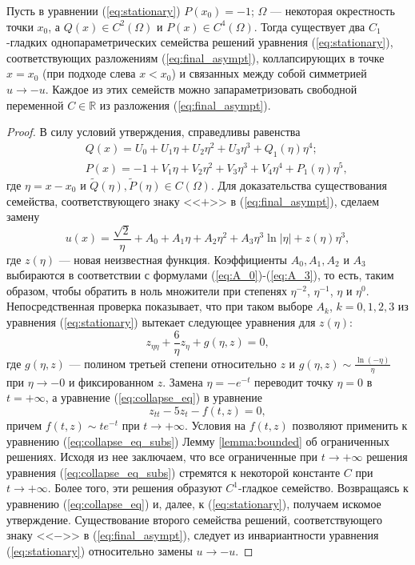 \begin{proposition}
Пусть в уравнении (\ref{eq:stationary}) $P(x_0) = -1$; $\Omega$ --- некоторая окрестность точки $x_0$, а $Q(x) \in C^2(\Omega)$ и $P(x) \in C^4(\Omega)$.
Тогда существует два $C_1$-гладких однопараметрических семейства решений уравнения (\ref{eq:stationary}), соответствующих разложениям (\ref{eq:final_asympt}), коллапсирующих в точке $x = x_0$ (при подходе слева $x < x_0$) и связанных между собой симметрией $u \to -u$.
Каждое из этих семейств можно запараметризовать свободной переменной $C \in \mathbb{R}$ из разложения (\ref{eq:final_asympt}).
\end{proposition}
%
\begin{proof}
В силу условий утверждения, справедливы равенства
%
\begin{eqnarray}
&& Q(x) = U_0 + U_1 \eta + U_2 \eta^2 + U_3 \eta^3 + Q_1(\eta)\eta^4; \\
&& P(x) = -1 + V_1 \eta+ V_2 \eta^2 + V_3 \eta^3 + V_4 \eta^4 + P_1(\eta)\eta^5,
\end{eqnarray}
%
где $\eta = x - x_0$ и $\widetilde{Q}(\eta), \widetilde{P}(\eta) \in C(\Omega)$.
Для доказательства существования семейства, соответствующего знаку <<$+$>> в (\ref{eq:final_asympt}), сделаем замену
%
\begin{equation}
u(x) = \frac{\sqrt{2}}\eta + A_0 + A_1 \eta + A_2 \eta^2 + A_3 \eta^3 \ln|\eta| + z(\eta)\eta^3,
\end{equation}
%
где $z(\eta)$ --- новая неизвестная функция.
Коэффициенты $A_0, A_1, A_2$ и $A_3$ выбираются в соответствии с формулами (\ref{eq:A_0})-(\ref{eq:A_3}), то есть, таким образом, чтобы обратить в ноль множители при степенях $\eta^{-2}$, $\eta^{-1}$, $\eta$ и $\eta^0$.
Непосредственная проверка показывает, что при таком выборе $A_k$, $k = 0,1,2,3$ из уравнения (\ref{eq:stationary}) вытекает следующее уравнения для $z(\eta)$:
%
\begin{equation}
z_{\eta\eta} + \frac{6}{\eta} z_\eta + g(\eta, z) = 0,
\label{eq:collapse_eq}
\end{equation}
%
где $g(\eta, z)$ --- полином третьей степени относительно $z$ и $g(\eta, z) \sim \frac{\ln(-\eta)}{\eta}$ при $\eta \to -0$ и фиксированном $z$.
Замена $\eta = -e^{-t}$ переводит точку $\eta = 0$ в $t = +\infty$, а уравнение (\ref{eq:collapse_eq}) в уравнение
%
\begin{equation}
z_{tt} - 5z_t - f(t,z) = 0,
\label{eq:collapse_eq_subs}
\end{equation}
%
причем $f(t,z) \sim te^{-t}$ при $t \to +\infty$.
Условия на $f(t,z)$ позволяют применить к уравнению (\ref{eq:collapse_eq_subs}) Лемму \ref{lemma:bounded} об ограниченных решениях.
Исходя из нее заключаем, что все ограниченные при $t \to +\infty$ решения уравнения (\ref{eq:collapse_eq_subs}) стремятся к некоторой константе $C$ при $t \to +\infty$.
Более того, эти решения образуют $C^1$-гладкое семейство.
Возвращаясь к уравнению (\ref{eq:collapse_eq}) и, далее, к (\ref{eq:stationary}), получаем искомое утверждение.
Существование второго семейства решений, соответствующего знаку <<$-$>> в (\ref{eq:final_asympt}), следует из инвариантности уравнения (\ref{eq:stationary}) относительно замены $u \to -u$.
\end{proof}

